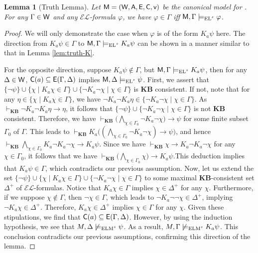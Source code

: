 \documentclass{article}
\newtheorem{lemma}[theorem]{Lemma}%
\newcommand{\CA}{\textnormal{\sf A}\xspace}
\newcommand{\CC}{\textnormal{\sf C}\xspace}
\newcommand{\CE}{\textnormal{\sf E}\xspace}
\newcommand{\CM}{\textnormal{\sf M}\xspace}
\newcommand{\CV}{\textnormal{\sf v}\xspace}
\newcommand{\CW}{\textnormal{\sf W}\xspace}
\renewcommand{\phi}{\varphi}
\newcommand{\ra}{\rightarrow}
\newcommand{\lang}{\ensuremath{\mathcal{EL}}\xspace}
\newcommand{\ls}{\text{\normalfont EL$^s$}\xspace}
\newcommand{\lsm}{\text{\normalfont ELM$^s$}\xspace}
\newcommand{\KB}{\ensuremath{\mathbf{KB}}\xspace}
\begin{document}
\begin{lemma}[Truth Lemma]
\label{lem:truth-KB}
Let $\CM = (\CW,\CA,\CE,\CC,\CV)$ be the canonical model for \ls. For any $\Gamma \in \CW$ and any \lang-formula $\phi$, we have $\phi \in \Gamma$ iff $\CM,\Gamma \models_{\ls} \phi$.
\end{lemma}
\begin{proof}
We will only demonstrate the case when $\phi$ is of the form $K_a \psi$ here. The direction from $K_a\psi\in \Gamma$ to $\CM,\Gamma\models_\ls K_a\psi$ can be shown in a manner similar to that in Lemma \ref{lem:truth-K}.

For the opposite direction, suppose $K_a\psi\notin \Gamma$, but $\CM,\Gamma\models_\ls K_a\psi$, then for any $\Delta\in \CW$, $\CC(a)\subseteq \CE (\Gamma,\Delta)$ implies $\CM,\Delta\models_\ls \psi$.
%
First, we assert that $\{\neg\psi\}\cup\{\chi\mid K_a\chi\in \Gamma\}\cup\{\neg K_a\neg\chi\mid \chi\in \Gamma\}$ is \KB consistent. If not, note that for any $\eta\in\{\chi\mid K_a\chi\in \Gamma\}$, we have $\neg K_a \neg K_a\eta\in \{\neg K_a\neg\chi\mid \chi\in \Gamma\}$. As $\vdash_\KB \neg K_a \neg K_a \eta \ra \eta$, it follows that $\{\neg\psi\}\cup\{\neg K_a\neg\chi\mid \chi\in \Gamma\}$ is not \KB consistent. Therefore, we have $\vdash_\KB \big(\bigwedge_{\chi\in\Gamma_0}\neg K_a\neg \chi \big) \ra \psi$ for some finite subset $\Gamma_0$ of $\Gamma$. This leads to $\vdash_\KB K_a\big((\bigwedge_{\chi\in\Gamma_0}\neg K_a\neg \chi) \ra \psi\big)$, and hence $\vdash_\KB \bigwedge_{\chi\in\Gamma_0}K_a\neg K_a\neg \chi \ra K_a\psi$. Since we have $\vdash_\KB \chi \ra K_a\neg K_a\neg \chi$ for any $\chi\in\Gamma_0$, it follows that we have $\vdash_\KB \big( \bigwedge_{\chi\in\Gamma_0}\chi \big) \ra K_a\psi$.This deduction implies that $K_a\psi \in \Gamma$, which contradicts our previous assumption.
%
Now, let us extend the set $\{\neg\psi\}\cup\{\chi\mid K_a\chi\in \Gamma\}\cup\{\neg K_a\neg\chi\mid \chi\in \Gamma\}$ to some maximal \KB-consistent set $\Delta^+$ of \lang-formulas. Notice that $K_a\chi\in \Gamma$ implies $\chi\in\Delta^+$ for any $\chi$. Furthermore, if we suppose $\chi\notin \Gamma$, then $\neg\chi\in \Gamma$, which leads to $\neg K_a\neg\neg\chi\in\Delta^+$, implying $\neg K_a\chi\in\Delta^+$. Therefore, $K_a\chi\in \Delta^+$ implies $\chi\in \Gamma$ for any $\chi$.
%
Given these stipulations, we find that $\CC(a)\subseteq\CE(\Gamma,\Delta)$. However, by using the induction hypothesis, we see that $M,\Delta\not\models_\lsm \psi$. As a result, $M,\Gamma\not\models_\lsm K_a\psi$. This conclusion contradicts our previous assumptions, confirming this direction of the lemma.
\end{proof}
\end{document}
